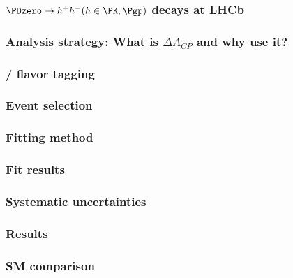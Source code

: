 \documentclass[18pt, aspectratio=169]{beamer}
\begin{document}
\begin{frame}
  \frametitle{$\PDzero \rightarrow h^+h^- (h \in {\PK, \Pgp})$ decays at LHCb}

\end{frame}

\begin{frame}
  \frametitle{Analysis strategy: What is $\Delta A_{CP}$ and why use it?}

\end{frame}

\begin{frame}
  \frametitle{{\PDzero}/{\APDzero} flavor tagging}
  
\end{frame}

\begin{frame}
  \frametitle{Event selection}
  
\end{frame}

\begin{frame}
  \frametitle{Fitting method}
  
\end{frame}

\begin{frame}
  \frametitle{Fit results}
  
\end{frame}

\begin{frame}
  \frametitle{Systematic uncertainties}
  
\end{frame}

\begin{frame}
  \frametitle{Results}
  
\end{frame}

\begin{frame}
  \frametitle{SM comparison}
  
\end{frame}
\end{document}
